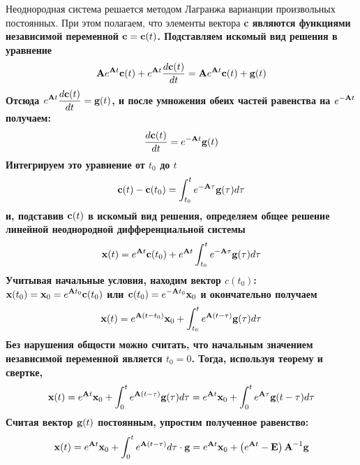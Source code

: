 Неоднородная система решается методом Лагранжа варианции произвольных постоянных. При этом полагаем, что элементы
вектора \bf{c} являются функциями независимой переменной $\bf{c} = \bf{c}(t)$. Подставляем искомый вид решения
в уравнение
\begin{equation*}
    \bf{A}e^{\bf{A}t}\bf{c}(t) + e^{\bf{A}t}\frac{d\bf{c}(t)}{dt} = \bf{A} e^{\bf{A}t}\bf{c}(t) + \bf{g}(t)
\end{equation*}
Отсюда $\displaystyle e^{\bf{A}t}\frac{d\bf{c}(t)}{dt} = \bf{g}(t)$, и после умножения обеих частей равенства на
$\displaystyle e^{-\bf{A}t}$ получаем:
\begin{equation*}
    \frac{d\bf{c}(t)}{dt} = e^{-\bf{A}t}\bf{g}(t)
\end{equation*}
Интегрируем это уравнение от $t_0$ до $t$
\begin{equation*}
    \bf{c}(t) - \bf{c}(t_0) = \int_{t_0}^{t} e^{-\bf{A}\tau}\bf{g}(\tau)d\tau
\end{equation*}
и, подставив $\bf{c}(t)$ в искомый вид решения, определяем общее решение линейной неоднородной дифференциальной системы
\begin{equation*}
    \bf{x}(t) = e^{\bf{A}t}\bf{c}(t_0) + e^{\bf{A}t}\int_{t_0}^{t}e^{-\bf{A}\tau}\bf{g}(\tau)d\tau
\end{equation*}
Учитывая начальные условия, находим вектор $\displaystyle c(t_0)$: $\displaystyle \bf{x}(t_0) = \bf{x}_0 = e^{\bf{A}t_0}\bf{c}(t_0)$
или $\displaystyle \bf{c}(t_0) = e^{-\bf{A}t_0}\bf{x}_0$ и окончательно получаем
\begin{equation*}
    \bf{x}(t) = e^{\bf{A}(t - t_0)}\bf{x}_0 + \int_{t_0}^{t} e^{\bf{A}(t - \tau)}\bf{g}(\tau)d\tau
\end{equation*}
Без нарушения общости можно считать, что начальным значением независимой переменной является $\displaystyle t_0 = 0$. Тогда, используя теорему и свертке,
\begin{equation}
    \bf{x}(t) = e^{\bf{A}t}\bf{x}_0 + \int_{0}^{t} e^{\bf{A}(t - \tau)}\bf{g}(\tau)d\tau = e^{\bf{A}t}\bf{x}_0 + \int_{0}^{t} e^{\bf{A}\tau}\bf{g}(t - \tau)d\tau \label{eq:1}
\end{equation}
Считая вектор $\bf{g}(t)$ постоянным, упростим полученное равенство:
\begin{equation*}
    \bf{x}(t) = e^{\bf{A}t}\bf{x}_0 + \int_{0}^{t} e^{\bf{A}(t - \tau)}d\tau \cdot \bf{g} = e^{\bf{A}t}\bf{x}_0 + \left( e^{\bf{A}t} - \bf{E} \right)\bf{A}^{-1}\bf{g}
\end{equation*}


